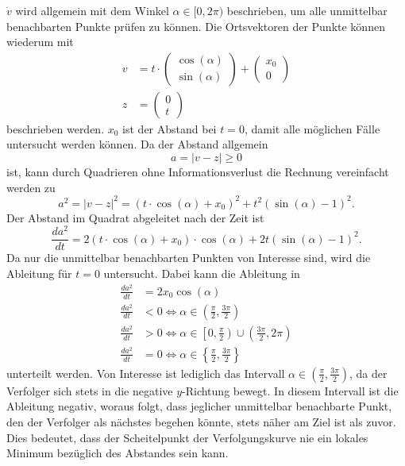 $\dot{v}$ wird allgemein mit dem Winkel $\alpha \in[ 0, 2\pi)$ beschrieben, um alle unmittelbar benachbarten Punkte prüfen zu können.
Die Ortsvektoren der Punkte können wiederum mit
\begin{align}
	v
	&=
	t\cdot\left(\begin{array}{c} \cos (\alpha) \\ \sin (\alpha) \end{array}\right) +\left(\begin{array}{c} x_0 \\ 0 \end{array}\right)
	\\
	z
	&=
	\left(\begin{array}{c} 0 \\ t \end{array}\right)
\end{align}
beschrieben werden.
$x_0$ ist der Abstand bei $t=0$, damit alle möglichen Fälle untersucht werden können.
Da der Abstand allgemein
\begin{equation}
	a
	=
	|v-z|
	\geq
	0
\end{equation}
ist, kann durch Quadrieren ohne Informationsverlust die Rechnung vereinfacht werden zu
\begin{equation}
	a^2
	=
	|v-z|^2
	=
	(t\cdot\cos(\alpha)+x_0)^2+t^2(\sin(\alpha)-1)^2
	\text{.}
\end{equation}
Der Abstand im Quadrat abgeleitet nach der Zeit ist
\begin{equation}
	\frac{d a^2}{d t}
	=
	2(t\cdot\cos (\alpha)+x_0)\cdot\cos(\alpha)+2t(\sin(\alpha)-1)^2
	\text{.}
\end{equation}
Da nur die unmittelbar benachbarten Punkten von Interesse sind, wird die Ableitung für $t=0$ untersucht. Dabei kann die Ableitung in 
\begin{align}
	\frac{d a^2}{d t}
	&=
	2x_0\cos(\alpha)
	\\
	\frac{d a^2}{d t}
	&<
	0\Leftrightarrow\alpha\in\left( \frac{\pi}{2}, \frac{3\pi}{2}\right)
	\\
	\frac{d a^2}{d t}
	&>
	0\Leftrightarrow\alpha\in\left[0, \frac{\pi}{2}\right)\cup\left(\frac{3\pi}{2}, 2\pi\right)
	\\
	\frac{d a^2}{d t}
	&=
	0\Leftrightarrow\alpha\in\left\{ \frac{\pi}{2}, \frac{3\pi}{2}\right\}
\end{align}
unterteilt werden.
Von Interesse ist lediglich das Intervall $\alpha\in\left( \frac{\pi}{2}, \frac{3\pi}{2}\right)$, da der Verfolger sich stets in die negative $y$-Richtung bewegt.
In diesem Intervall ist die Ableitung negativ, woraus folgt, dass jeglicher unmittelbar benachbarte Punkt, den der Verfolger als nächstes begehen könnte, stets näher am Ziel ist als zuvor.
Dies bedeutet, dass der Scheitelpunkt der Verfolgungskurve nie ein lokales Minimum bezüglich des Abstandes sein kann.
%

